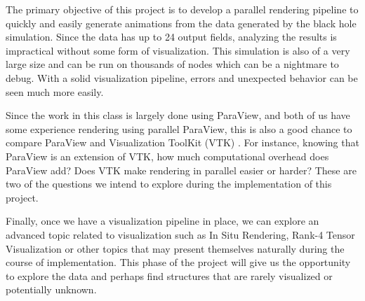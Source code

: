 The primary objective of this project is to develop a parallel rendering pipeline to quickly and easily generate animations from the data generated by the black hole simulation. Since the data has up to 24 output fields, analyzing the results is impractical without some form of visualization. This simulation is also of a very large size and can be run on thousands of nodes which can be a nightmare to debug. With a solid visualization pipeline, errors and unexpected behavior can be seen much more easily.

Since the work in this class is largely done using ParaView, and both of us have some experience rendering using parallel ParaView, this is also a good chance to compare ParaView and Visualization ToolKit (VTK) \cite{vtk}. For instance, knowing that ParaView is an extension of VTK, how much computational overhead does ParaView add? Does VTK make rendering in parallel easier or harder? These are two of the questions we intend to explore during the implementation of this project.

Finally, once we have a visualization pipeline in place, we can explore an advanced topic related to visualization such as In Situ Rendering, Rank-4 Tensor Visualization or other topics that may present themselves naturally during the course of implementation. This phase of the project will give us the opportunity to explore the data and perhaps find structures that are rarely visualized or potentially unknown.